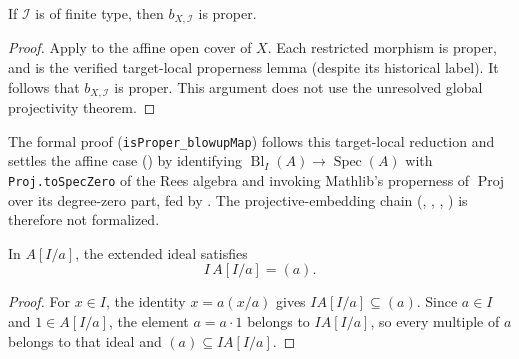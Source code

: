\begin{theorem}
  \label{thm:nagata-global-blowup-proper}
  \leanok

  If \(\mathcal I\) is of finite type, then
  \(b_{X,\mathcal I}\) is proper.
\end{theorem}

\begin{proof}
  \leanok
  Apply  to the affine open cover
  of $X$.  Each restricted morphism is proper, and
   is the verified target-local
  properness lemma (despite its historical label).  It follows that
  $b_{X,\mathcal I}$ is proper.  This argument does not use the unresolved
  global projectivity theorem.
\end{proof}

\begin{remark}
  The formal proof (\texttt{isProper\_blowupMap}) follows this target-local
  reduction and settles the affine case
  () by identifying
  $\operatorname{Bl}_I(A)\to\operatorname{Spec}(A)$ with
  \texttt{Proj.toSpecZero} of the Rees algebra and invoking Mathlib's
  properness of $\operatorname{Proj}$ over its degree-zero part, fed by
  .  The projective-embedding chain
  (,
  ,
  ,
  ) is therefore not formalized.
\end{remark}

\begin{lemma}
  \label{lemma:nagata-chart-extended-ideal-principal}
  \leanok

  In $A[I/a]$, the extended ideal satisfies
  \[
    I\,A[I/a]=(a).
  \]
\end{lemma}

\begin{proof}
  \leanok
  For $x\in I$, the identity $x=a(x/a)$ gives
  $IA[I/a]\subseteq(a)$.  Since $a\in I$ and $1\in A[I/a]$, the element
  $a=a\cdot1$ belongs to $IA[I/a]$, so every multiple of $a$ belongs to that
  ideal and $(a)\subseteq IA[I/a]$.
\end{proof}

